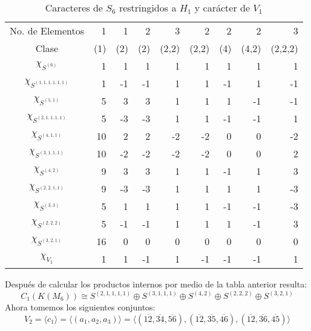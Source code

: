 \documentclass[12pt]{book}
\theoremstyle{definition}
\newcounter{in}
\begin{document}
  \begin{table}[!hbtp]
    \centering
    \begin{tabular}{c |r r r r r r r r}
      No. de Elementos  & 1 & 1 & 2 & 3 & 2 & 2 & 2 & 3  \\
      Clase&(1)& (2) & (2) & (2,2) & (2,2)& (4) & (4,2) & (2,2,2)\\
      \hline
      $\chi_{S^{{(6)}}}$         & 1 & 1 &1  & 1 & 1 & 1 & 1 & 1\\
      $\chi_{S^{{(1,1,1,1,1,1)}}}$ & 1 & -1&-1 & 1 & 1 &-1 & 1 &-1\\
      $\chi_{S^{{(5,1)}}}$       & 5 & 3 & 3 & 1 & 1 & 1 &-1 &-1\\
      $\chi_{S^{{(2,1,1,1,1)}}}$  & 5 & -3& -3 & 1 &1 &-1 &-1 & 1\\
      $\chi_{S^{{(4,1,1)}}}$     & 10& 2  & 2 &-2 &-2& 0 & 0 & -2\\
      $\chi_{S^{{(3,1,1,1)}}}$    & 10&-2 & -2&-2 & -2& 0 & 0 &2\\
      $\chi_{S^{{(4,2)}}}$       & 9 & 3 & 3 & 1 & 1 & -1& 1 & 3\\
      $\chi_{S^{{(2,2,1,1)}}}$    & 9 &-3 & -3&1  & 1 & 1 & 1 & -3\\
      $\chi_{S^{{(3,3)}}}$       & 5 & 1 & 1 &1  &1  & -1& -1& -3\\
      $\chi_{S^{{(2,2,2)}}}$     & 5 &-1 & -1&1  & 1 & 1 &-1& 3\\
      $\chi_{S^{{(3,2,1)}}}$     & 16 &0 &0  & 0 & 0 & 0 & 0& 0\\
      \hline
      $\chi_{V_{1}}$        & 1 & 1 & -1 & 1 & -1 & -1 &-1 & 1  \\
    \end{tabular}
    
    \caption{Caracteres de $S_{6}$ restringidos a $H_{1}$ y carácter de $V_{1}$}
    \label{tab:clanes-H_1-6}
  \end{table}
  Después de calcular los productos internos por medio de la tabla
  anterior resulta:
  \begin{equation}
    C_{1}(K(M_{6}))\cong S^{(2,1,1,1,1)}\oplus S^{(3,1,1,1)}\oplus
    S^{(4,2)} \oplus S^{(2,2,2)}\oplus S^{(3,2,1)}
    \label{C1-KM6}
  \end{equation}
  Ahora tomemos los siguientes conjuntos:
  $$V_{2}=\langle c_{1}\rangle=\langle
  (a_{1},a_{2},a_{3})\rangle=\langle(\overline{12},\overline{34},\overline{56}),(\overline{12},\overline{35},\overline{46}),(\overline{12},\overline{36},\overline{45})\rangle$$
\end{document}
